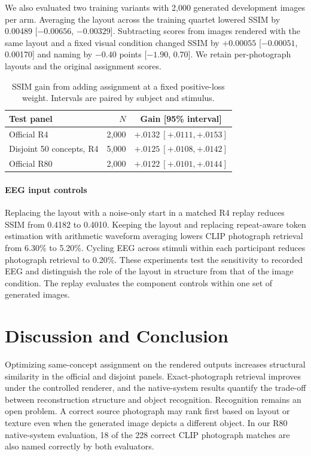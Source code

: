 \documentclass[letterpaper,10pt,conference]{IEEEtran}
\begin{document}
We also evaluated two training variants with 2,000 generated development images per arm. Averaging the layout across the training quartet lowered SSIM by 0.00489 [$-0.00656$, $-0.00329$]. Subtracting scores from images rendered with the same layout and a fixed visual condition changed SSIM by $+0.00055$ [$-0.00051$, 0.00170] and naming by $-0.40$ points [$-1.90$, 0.70]. We retain per-photograph layouts and the original assignment scores.

\begin{table}[t]
\centering
\caption{SSIM gain from adding assignment at a fixed positive-loss weight. Intervals are paired by subject and stimulus.}
\label{tab:ablation}
\small
\begin{tabular}{@{}lrc@{}}
\toprule
Test panel & \(N\) & Gain [95\% interval] \\
\midrule
Official R4 & 2,000 & \(+.0132~[+.0111,+.0153]\) \\
Disjoint 50 concepts, R4 & 5,000 & \(+.0125~[+.0108,+.0142]\) \\
Official R80 & 2,000 & \(+.0122~[+.0101,+.0144]\) \\
\bottomrule
\end{tabular}
\end{table}

\paragraph{EEG input controls}
Replacing the layout with a noise-only start in a matched R4 replay reduces SSIM from 0.4182 to 0.4010. Keeping the layout and replacing repeat-aware token estimation with arithmetic waveform averaging lowers CLIP photograph retrieval from 6.30\% to 5.20\%. Cycling EEG across stimuli within each participant reduces photograph retrieval to 0.20\%. These experiments test the sensitivity to recorded EEG and distinguish the role of the layout in structure from that of the image condition. The replay evaluates the component controls within one set of generated images.

\section{Discussion and Conclusion}

Optimizing same-concept assignment on the rendered outputs increases structural similarity in the official and disjoint panels. Exact-photograph retrieval improves under the controlled renderer, and the native-system results quantify the trade-off between reconstruction structure and object recognition. Recognition remains an open problem. A correct source photograph may rank first based on layout or texture even when the generated image depicts a different object. In our R80 native-system evaluation, 18 of the 228 correct CLIP photograph matches are also named correctly by both evaluators.
\end{document}
